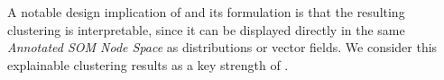 A notable design implication of \ClimateSOM and its formulation is that the resulting clustering is interpretable, since it can be displayed directly in the same \textit{Annotated SOM Node Space} as distributions or vector fields.
%
%
We consider this explainable clustering results as a key strength of \ClimateSOM.
%





